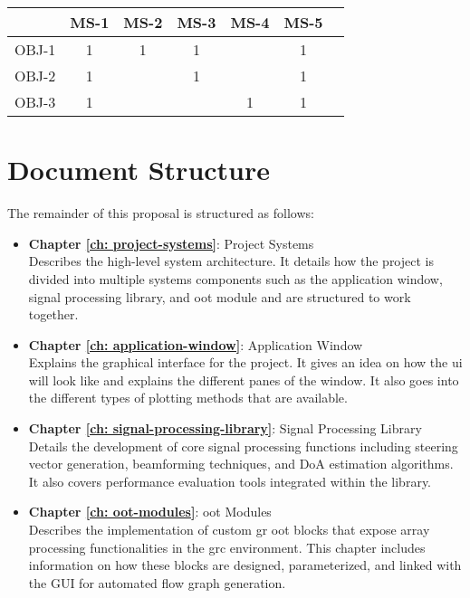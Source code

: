 \begin{center}
	\begin{tabular}{|c|c|c|c|c|c|c|}
		\hline
		& MS-1 & MS-2 & MS-3 & MS-4 & MS-5 \\ \hline
		OBJ-1 & 1    & 1    &  1    &     &   1         \\ \hline
		OBJ-2 & 1    &      &  1    &     &   1         \\ \hline
		OBJ-3 & 1    &      &       & 1   &   1    \\ \hline
	\end{tabular}
\end{center}

\section{Document Structure}

The remainder of this proposal is structured as follows:

\begin{itemize}
	
	\item \textbf{Chapter \ref{ch: project-systems}}: Project Systems \\
	\indent Describes the high-level system architecture. It details how the project is divided into multiple systems  components such as the application window, signal processing library, and \ac{oot} module and are structured to work together.
	
	\item \textbf{Chapter \ref{ch: application-window}}: Application Window \\
	\indent Explains the graphical interface for the project. It gives an idea on how the \ac{ui} will look like and explains the different panes of the window. It also goes into the different types of plotting methods that are available.
	
	\item \textbf{Chapter \ref{ch: signal-processing-library}}: Signal Processing Library \\
	\indent Details the development of core signal processing functions including steering vector generation, beamforming techniques, and DoA estimation algorithms. It also covers performance evaluation tools integrated within the library.
	
	\item \textbf{Chapter \ref{ch: oot-modules}}: \acf{oot} Modules \\
	\indent Describes the implementation of custom \acl{gr} \ac{oot} blocks that expose array processing functionalities in the \ac{grc} environment. This chapter includes information on how these blocks are designed, parameterized, and linked with the GUI for automated flow graph generation.
	
\end{itemize}



